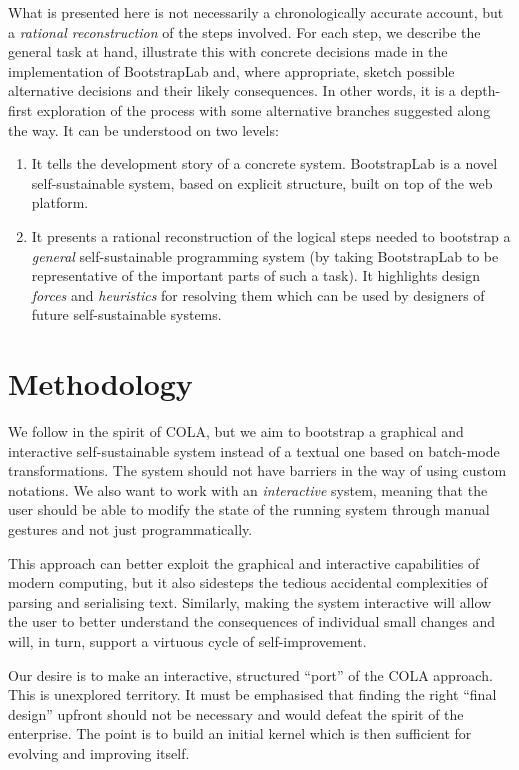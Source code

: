 \documentclass[ twoside,openright,titlepage,numbers=noenddot,headinclude,footinclude,cleardoublepage=empty,abstract=on,
                BCOR=5mm,paper=a4,fontsize=11pt
                ]{scrreprt}
\providecommand{\tightlist}{}\newenvironment{longtable}[2]{\begin{tabular}}{\end{tabular}}
\theoremstyle{definition}
\begin{document}
What is presented here is not necessarily a chronologically accurate
account, but a \emph{rational reconstruction} of the steps involved. For
each step, we describe the general task at hand, illustrate this with
concrete decisions made in the implementation of BootstrapLab and, where
appropriate, sketch possible alternative decisions and their likely
consequences. In other words, it is a depth-first exploration of the
process with some alternative branches suggested along the way. It can
be understood on two levels:

\begin{enumerate}
\def\labelenumi{\arabic{enumi}.}
\tightlist
\item
  It tells the development story of a concrete system. BootstrapLab is a
  novel self-sustainable system, based on explicit structure, built on
  top of the web platform.
\item
  It presents a rational reconstruction of the logical steps needed to
  bootstrap a \emph{general} self-sustainable programming system (by
  taking BootstrapLab to be representative of the important parts of
  such a task). It highlights design \emph{forces} and \emph{heuristics}
  for resolving them which can be used by designers of future
  self-sustainable systems.
\end{enumerate}

\hypertarget{methodology}{\section{Methodology}\label{methodology}}

We follow in the spirit of \ac{COLA}, but we aim to bootstrap a
graphical and interactive self-sustainable system instead of a textual
one based on batch-mode transformations. The system should not have
barriers in the way of using custom notations. We also want to work with
an \emph{interactive} system, meaning that the user should be able to
modify the state of the running system through manual gestures and not
just programmatically.

This approach can better exploit the graphical and interactive
capabilities of modern computing, but it also sidesteps the tedious
accidental complexities of parsing and serialising text. Similarly,
making the system interactive will allow the user to better understand
the consequences of individual small changes and will, in turn, support
a virtuous cycle of self-improvement.

Our desire is to make an interactive, structured ``port'' of the
\ac{COLA} approach. This is unexplored territory. It must be emphasised
that finding the right ``final design'' upfront should not be necessary
and would defeat the spirit of the enterprise. The point is to build an
initial kernel which is then sufficient for evolving and improving
itself.
\end{document}
